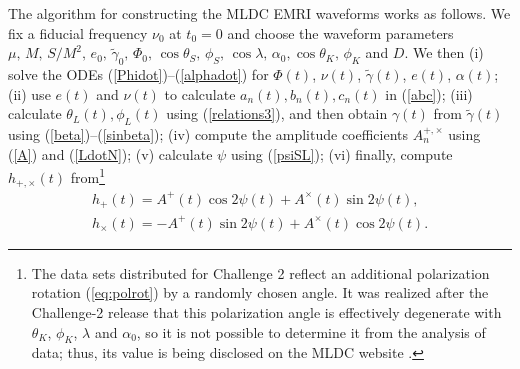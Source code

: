\documentclass{iopart}
\begin{document}
The algorithm for constructing the MLDC EMRI waveforms works as follows. We fix a fiducial frequency $\nu_0$ at $t_0 = 0$ and choose the waveform parameters $\mu,\, M,\,S/M^2,\,e_0,\,\tilde\gamma_0,\,\Phi_0,\,\cos\theta_S,\,\phi_S,\,\cos\lambda,\,\alpha_0,\cos\theta_K,\,\phi_K$ and $D$. We then (i) solve the ODEs (\ref{Phidot})--(\ref{alphadot}) for $\Phi(t)$, $\nu(t)$, $\tilde\gamma(t)$, $e(t)$, $\alpha(t)$; (ii) use $e(t)$ and $\nu(t)$ to calculate $a_n(t), b_n(t), c_n(t)$ in (\ref{abc}); (iii) calculate $\theta_L(t),\phi_L(t)$ using (\ref{relations3}), and then obtain $\gamma(t)$ from $\tilde\gamma(t)$ using (\ref{beta})--(\ref{sinbeta}); (iv) compute the amplitude coefficients $A_n^{+,\times}$ using (\ref{A}) and (\ref{LdotN}); (v) calculate $\psi$ using (\ref{psiSL}); (vi) finally, compute $h_{+,\times}(t)$ from\footnote{The data sets distributed for Challenge 2 reflect an additional polarization rotation (\ref{eq:polrot}) by a randomly chosen angle. It was realized after the Challenge-2 release that this polarization angle is effectively degenerate with $\theta_K$, $\phi_K$, $\lambda$ and $\alpha_0$, so it is not possible to determine it from the analysis of data; thus, its value is being disclosed on the MLDC website \cite{MLDCweb}.}
\begin{eqnarray}\label{final}
h_+(t) = A^+(t) \cos 2\psi(t) + A^{\times}(t) \sin 2\psi(t), \nonumber \\
h_{\times}(t) = - A^+(t) \sin 2\psi(t) + A^{\times}(t) \cos 2\psi(t).
\end{eqnarray}
\end{document}
